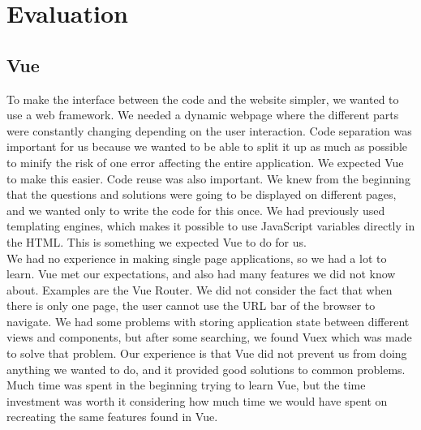 \section{Evaluation}
\subsection{Vue}
To make the interface between the code and the website simpler, we wanted to use a web framework. We needed a dynamic webpage where the different parts were constantly changing depending on the user interaction. Code separation was important for us because we wanted to be able to split it up as much as possible to minify the risk of one error affecting the entire application. We expected Vue to make this easier. Code reuse was also important. We knew from the beginning that the questions and solutions were going to be displayed on different pages, and we wanted only to write the code for this once. We had previously used templating engines, which makes it possible to use JavaScript variables directly in the HTML. This is something we expected Vue to do for us.
\\[11pt]
We had no experience in making single page applications, so we had a lot to learn. Vue met our expectations, and also had many features we did not know about. Examples are the Vue Router. We did not consider the fact that when there is only one page, the user cannot use the URL bar of the browser to navigate. We had some problems with storing application state between different views and components, but after some searching, we found Vuex which was made to solve that problem. Our experience is that Vue did not prevent us from doing anything we wanted to do, and it provided good solutions to common problems. Much time was spent in the beginning trying to learn Vue, but the time investment was worth it considering how much time we would have spent on recreating the same features found in Vue.